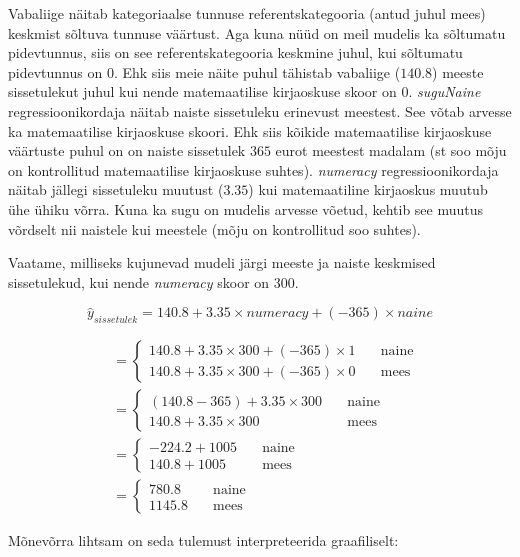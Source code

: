 \documentclass[
]{book}
\begin{document}
Vabaliige näitab kategoriaalse tunnuse referentskategooria (antud juhul mees) keskmist sõltuva tunnuse väärtust. Aga kuna nüüd on meil mudelis ka sõltumatu pidevtunnus, siis on see referentskategooria keskmine juhul, kui sõltumatu pidevtunnus on \(0\). Ehk siis meie näite puhul tähistab vabaliige (\(140.8\)) meeste sissetulekut juhul kui nende matemaatilise kirjaoskuse skoor on \(0\). \emph{suguNaine} regressioonikordaja näitab naiste sissetuleku erinevust meestest. See võtab arvesse ka matemaatilise kirjaoskuse skoori. Ehk siis kõikide matemaatilise kirjaoskuse väärtuste puhul on on naiste sissetulek \(365\) eurot meestest madalam (st soo mõju on kontrollitud matemaatilise kirjaoskuse suhtes). \emph{numeracy} regressioonikordaja näitab jällegi sissetuleku muutust (\(3.35\)) kui matemaatiline kirjaoskus muutub ühe ühiku võrra. Kuna ka sugu on mudelis arvesse võetud, kehtib see muutus võrdselt nii naistele kui meestele (mõju on kontrollitud soo suhtes).

Vaatame, milliseks kujunevad mudeli järgi meeste ja naiste keskmised sissetulekud, kui nende \emph{numeracy} skoor on 300.

\[\hat{y}_{sissetulek}=140.8+3.35 \times numeracy + (-365) \times naine\]

\begin{align}
&=
  \begin{cases}
    140.8+3.35 \times 300 + (-365) \times 1  & \quad \text{naine}\\
    140.8+3.35 \times 300 + (-365) \times 0  & \quad \text{mees}
  \end{cases}\\
&=
  \begin{cases}
    (140.8-365)+3.35 \times 300  & \quad \text{naine}\\
    140.8+3.35 \times 300 & \quad \text{mees}
  \end{cases}\\
&=
  \begin{cases}
    -224.2+1005  & \quad \text{naine}\\
    140.8+1005 & \quad \text{mees}
  \end{cases}\\
&=
  \begin{cases}
    780.8  & \quad \text{naine}\\
    1145.8 & \quad \text{mees}
  \end{cases}
\end{align}

Mõnevõrra lihtsam on seda tulemust interpreteerida graafiliselt:
\end{document}
